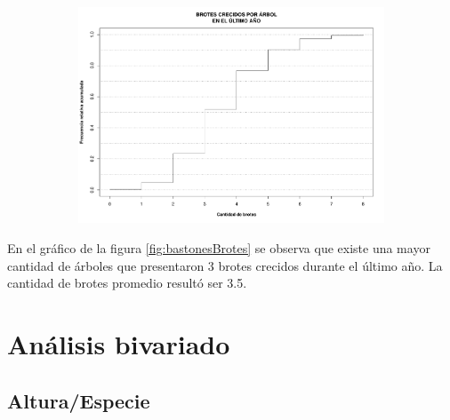 \documentclass[11pt]{article}
\begin{document}
\begin{figure}[h!]
  \ContinuedFloat
  \begin{center}
    \begin{subfigure}[b]{0.9\linewidth}
      \includegraphics[width=\linewidth]{acumBrotes.pdf}
      \caption{}
      \label{fig:acumBrotes}
    \end{subfigure}
  \caption{}
  \end{center}  
\end{figure}

\newpage

\begin{justify}
  En el gráfico de la figura \ref{fig:bastonesBrotes} se observa que
  existe una mayor cantidad de árboles que presentaron 3 brotes crecidos
  durante el último año. La cantidad de brotes promedio resultó ser 3.5.
\end{justify}


\newpage
\section{Análisis bivariado}

\subsection{Altura/Especie}
\end{document}
